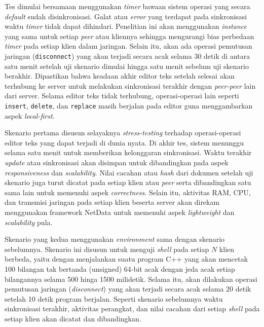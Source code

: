 Tes dimulai bersamaan menggunakan \textit{timer} bawaan sistem operasi yang secara \textit{default} sudah disinkronisasi. Galat atau \textit{error} yang terdapat pada sinkronisasi waktu \textit{timer} tidak dapat dihindari. Penelitian ini akan menggunakan \textit{instance} yang sama untuk setiap \textit{peer} atau kliennya sehingga mengurangi bias perbedaan \textit{timer} pada setiap klien dalam jaringan.  Selain itu, akan ada operasi pemutusan jaringan (\texttt{disconnect}) yang akan terjadi secara acak selama 30 detik di antara satu menit setelah uji skenario dimulai hingga satu menit sebelum uji skenario berakhir. Dipastikan bahwa keadaan akhir editor teks setelah selesai akan terhubung ke server untuk melakukan sinkronisasi terakhir dengan \textit{peer-peer} lain dari server.  Selama editor teks tidak terhubung, operasi-operasi lain seperti \texttt{insert}, \texttt{delete}, dan \texttt{replace} masih berjalan pada editor guna menggambarkan aspek \textit{local-first}.

Skenario pertama disusun selayaknya \textit{stress-testing} terhadap operasi-operasi editor teks yang dapat terjadi di dunia nyata. Di akhir tes, sistem menunggu selama satu menit untuk memberikan kelonggaran sinkronisasi. Waktu terakhir \textit{update} atau sinkronisasi akan disimpan untuk dibandingkan pada aspek \textit{responsiveness} dan \textit{scalability}. Nilai cacahan atau \textit{hash} dari dokumen setelah uji skenario juga turut dicatat pada setiap klien atau \textit{peer} serta dibandingkan satu sama lain untuk memenuhi aspek \textit{correctness}. Selain itu, aktivitas RAM, CPU, dan transmisi jaringan pada setiap klien beserta server akan direkam menggunakan framework NetData untuk memenuhi aspek \textit{lightweight} dan \textit{scalability} pula.

Skenario yang kedua menggunakan \textit{environment} sama dengan skenario sebelumnya. Skenario ini disusun untuk menguji \textit{shell} pada setiap $N$ klien berbeda, yaitu dengan menjalankan suatu program C++ yang akan mencetak 100 bilangan tak bertanda (unsigned) 64-bit acak dengan jeda acak setiap bilangannya selama 500 hinga 1500 milidetik. Selama itu, akan dilakukan operasi pemutusan jaringan (\textit{disconnect}) yang akan terjadi secara acak selama 20 detik setelah 10 detik program berjalan. Seperti skenario sebelumnya waktu sinkronisasi terakhir, aktivitas perangkat, dan nilai cacahan dari setiap \textit{shell} pada setiap klien akan dicatat dan dibandingkan.

